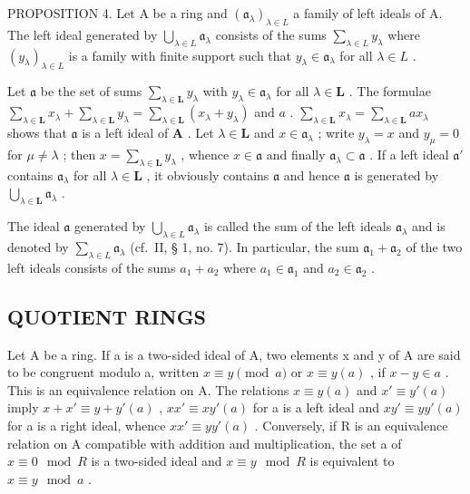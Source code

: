 PROPOSITION 4. Let A be a ring and \((\mathfrak{a}_{\lambda})_{\lambda \in L}\) a family of left ideals of A. The left ideal generated by \(\bigcup_{\lambda \in L} \mathfrak{a}_{\lambda}\) consists of the sums \(\sum_{\lambda \in L} y_{\lambda}\) where \((y_{\lambda})_{\lambda \in L}\) is a family with finite support such that \(y_{\lambda} \in \mathfrak{a}_{\lambda}\) for all \(\lambda \in L\) .

Let \(\mathfrak{a}\) be the set of sums \(\sum_{\lambda \in \mathbf{L}} y_{\lambda}\) with \(y_{\lambda} \in \mathfrak{a}_{\lambda}\) for all \(\lambda \in \mathbf{L}\) . The formulae \(\sum_{\lambda \in \mathbf{L}} x_{\lambda} + \sum_{\lambda \in \mathbf{L}} y_{\lambda} = \sum_{\lambda \in \mathbf{L}} (x_{\lambda} + y_{\lambda})\) and \(a\) . \(\sum_{\lambda \in \mathbf{L}} x_{\lambda} = \sum_{\lambda \in \mathbf{L}} ax_{\lambda}\) shows that \(\mathfrak{a}\) is a left ideal of \(\mathbf{A}\) . Let \(\lambda \in \mathbf{L}\) and \(x \in \mathfrak{a}_{\lambda}\) ; write \(y_{\lambda} = x\) and \(y_{\mu} = 0\) for \(\mu \neq \lambda\) ; then \(x = \sum_{\lambda \in \mathbf{L}} y_{\lambda}\) , whence \(x \in \mathfrak{a}\) and finally \(\mathfrak{a}_{\lambda} \subset \mathfrak{a}\) . If a left ideal \(\mathfrak{a}'\) contains \(\mathfrak{a}_{\lambda}\) for all \(\lambda \in \mathbf{L}\) , it obviously contains \(\mathfrak{a}\) and hence \(\mathfrak{a}\) is generated by \(\bigcup_{\lambda \in \mathbf{L}} \mathfrak{a}_{\lambda}\) .

The ideal \(\mathfrak{a}\) generated by \(\bigcup_{\lambda \in L} \mathfrak{a}_{\lambda}\) is called the sum of the left ideals \(\mathfrak{a}_{\lambda}\) and is denoted by \(\sum_{\lambda \in L} \mathfrak{a}_{\lambda}\) (cf.~II, § 1, no. 7). In particular, the sum \(\mathfrak{a}_{1} + \mathfrak{a}_{2}\) of the two left ideals consists of the sums \(a_{1} + a_{2}\) where \(a_{1} \in \mathfrak{a}_{1}\) and \(a_{2} \in \mathfrak{a}_{2}\) .

\subsection{QUOTIENT RINGS}

Let A be a ring. If a is a two-sided ideal of A, two elements x and y of A are said to be congruent modulo a, written \(x \equiv y \pmod{a}\) or \(x \equiv y(a)\) , if \(x - y \in a\) . This is an equivalence relation on A. The relations \(x \equiv y(a)\) and \(x' \equiv y'(a)\) imply \(x + x' \equiv y + y'(a)\) , \(xx' \equiv xy'(a)\) for a is a left ideal and \(xy' \equiv yy'(a)\) for a is a right ideal, whence \(xx' \equiv yy'(a)\) . Conversely, if R is an equivalence relation on A compatible with addition and multiplication, the set a of \(x \equiv 0 \mod R\) is a two-sided ideal and \(x \equiv y \mod R\) is equivalent to \(x \equiv y \mod a\) .

